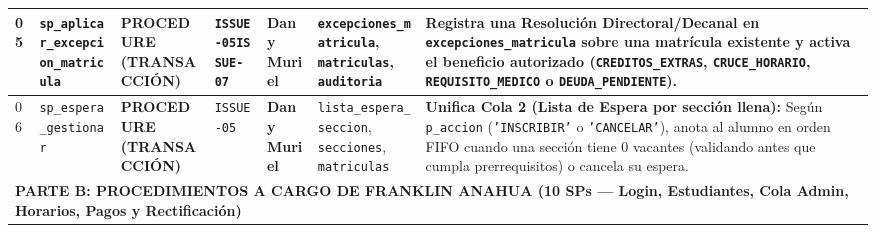 \documentclass[10pt,a4paper,landscape]{article}
\newcommand{\objProcTx}{\textbf{\textcolor{unjbgNavy}{PROCEDURE (TRANSACCIÓN)}}}
\newcommand{\devDany}{\textbf{\textcolor{unjbgNavy}{Dany Muriel}} \newline {\scriptsize(Lead / QA)}}
\begin{document}
\begin{longtable}{|p{0.5cm}|p{4.8cm}|p{3.3cm}|p{1.9cm}|p{2.5cm}|p{4.2cm}|p{8.0cm}|}
\hline
05 & \texttt{sp\_aplicar\_excepcion\_matricula} & \objProcTx & \texttt{ISSUE-05}\newline \texttt{ISSUE-07} & \devDany & \texttt{excepciones\_matricula}, \texttt{matriculas}, \texttt{auditoria} & Registra una Resolución Directoral/Decanal en \texttt{excepciones\_matricula} sobre una matrícula existente y activa el beneficio autorizado (\texttt{CREDITOS\_EXTRAS}, \texttt{CRUCE\_HORARIO}, \texttt{REQUISITO\_MEDICO} o \texttt{DEUDA\_PENDIENTE}). \\
\hline
\rowcolor{rowAlt}
06 & \texttt{sp\_espera\_gestionar} & \objProcTx & \texttt{ISSUE-05} & \devDany & \texttt{lista\_espera\_seccion}, \texttt{secciones}, \texttt{matriculas} & \textbf{Unifica Cola 2 (Lista de Espera por sección llena):} Según \texttt{p\_accion} (\texttt{'INSCRIBIR'} o \texttt{'CANCELAR'}), anota al alumno en orden FIFO cuando una sección tiene 0 vacantes (validando antes que cumpla prerrequisitos) o cancela su espera. \\
\hline

\multicolumn{7}{|l|}{\cellcolor{badgeFranklin}\textbf{\textcolor{unjbgNavy}{PARTE B: PROCEDIMIENTOS A CARGO DE FRANKLIN ANAHUA (10 SPs — Login, Estudiantes, Cola Admin, Horarios, Pagos y Rectificación)}}} \\
\hline


\end{longtable}
\end{document}
